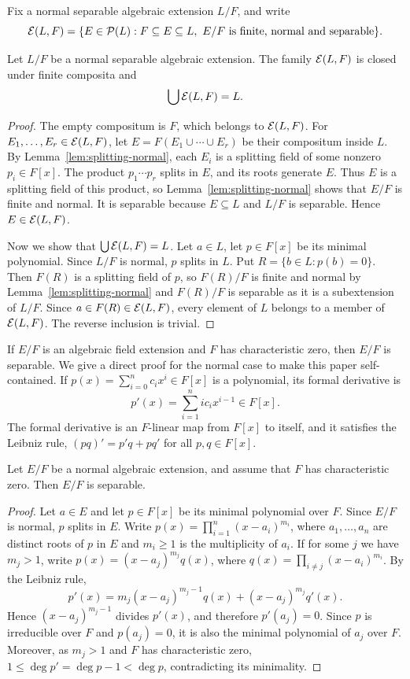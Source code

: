 Fix a normal separable algebraic extension $L/F$, and write
\[
 \mathcal E(L,F)=\{E\in \mathcal P(L):F\subseteq E\subseteq L,
       \ E/F\text{ is finite, normal and separable}\}.
\]

\begin{lemma}\label{lem:finite-subextensions}
Let $L/F$ be a normal separable algebraic extension.
The family $\mathcal E(L,F)$ is closed under finite composita and
\[
 \bigcup\mathcal E(L,F)=L.
\]
\end{lemma}

\begin{proof}
The empty compositum is $F$, which belongs to $\mathcal E(L,F)$.
For $E_1,\ldots,E_r\in\mathcal E(L,F)$, let
$E=F(E_1\cup\cdots\cup E_r)$ be their compositum inside $L$.
By Lemma~\ref{lem:splitting-normal}, each $E_i$ is a splitting
field of some nonzero $p_i\in F[x]$. The product $p_1\cdots p_r$
splits in $E$, and its roots generate $E$.
Thus $E$ is a splitting field of this product, so
Lemma~\ref{lem:splitting-normal} shows that $E/F$ is finite and normal.
It is separable because $E\subseteq L$ and $L/F$ is separable.
Hence $E\in\mathcal E(L,F)$.

Now we show that $\bigcup\mathcal E(L,F)=L$.
Let $a\in L$, let $p\in F[x]$ be its minimal polynomial.
Since $L/F$ is normal, $p$ splits in $L$.
Put $R=\{b\in L:p(b)=0\}$. Then $F(R)$ is a splitting field
of $p$, so $F(R)/F$ is finite and normal by
Lemma~\ref{lem:splitting-normal} and $F(R)/F$ is separable as it is a subextension
of $L/F$. Since $a\in F(R)\in\mathcal E(L,F)$, every element of $L$
belongs to a member of $\mathcal E(L,F)$. The reverse inclusion is trivial.
\end{proof}

If $E/F$ is an algebraic field extension and $F$ has characteristic zero, then $E/F$ is separable.
We give a direct proof for the normal case to make this paper self-contained.
If $p(x)=\sum_{i=0}^n c_i x^i\in F[x]$ is a polynomial, its formal derivative is
\[
 p'(x)=\sum_{i=1}^n i c_i x^{i-1}\in F[x].
\]
The formal derivative is an $F$-linear map from $F[x]$ to itself, and it satisfies the Leibniz rule, $(pq)'=p'q+pq'$ for all $p,q\in F[x]$.

\begin{lemma}\label{lem:normal-separable}
Let $E/F$ be a normal algebraic extension, and assume that $F$ has characteristic zero. Then $E/F$ is separable.
\end{lemma}
\begin{proof}
       Let $a\in E$ and let $p\in F[x]$ be its minimal polynomial over $F$. Since $E/F$ is normal, $p$ splits in $E$.
       Write $p(x)=\prod_{i=1}^n (x-a_i)^{m_i}$, where $a_1,\ldots,a_n$ are distinct roots of $p$ in $E$ and $m_i\ge 1$ is the multiplicity of $a_i$.
       If for some $j$ we have $m_j>1$, write $p(x)=(x-a_j)^{m_j}q(x)$, where $q(x)=\prod_{i\ne j}(x-a_i)^{m_i}$. By the Leibniz rule,
       \[
       p'(x)=m_j(x-a_j)^{m_j-1}q(x)+(x-a_j)^{m_j}q'(x).
       \]
       Hence $(x-a_j)^{m_j-1}$ divides $p'(x)$, and therefore $p'(a_j)=0$.
       Since $p$ is irreducible over $F$ and $p(a_j)=0$, it is also the minimal polynomial of $a_j$ over $F$.
       Moreover, as $m_j>1$ and $F$ has characteristic zero, $1\leq\deg p'=\deg p-1<\deg p$, contradicting its minimality.
\end{proof}
